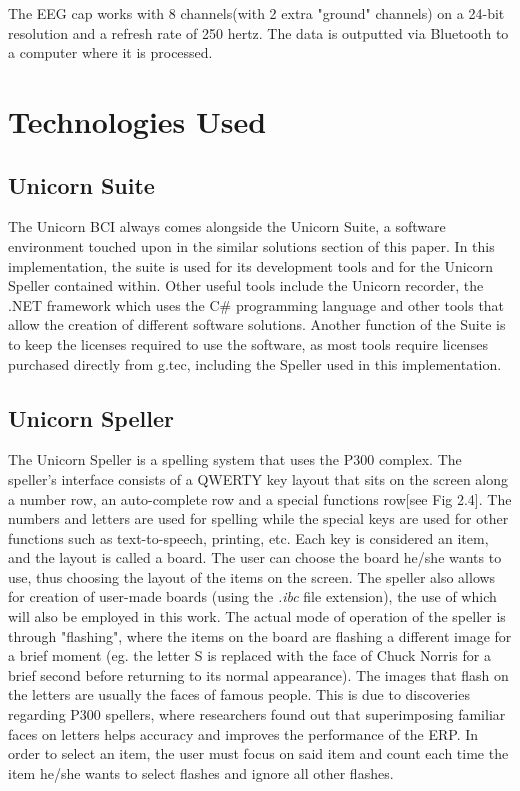 The EEG cap works with 8 channels(with 2 extra "ground" channels) on a 24-bit resolution and a refresh rate of 250 hertz. The data is outputted via Bluetooth to a computer where it is processed.


\section{Technologies Used}
\subsection{Unicorn Suite}
The Unicorn BCI always comes alongside the Unicorn Suite, a software environment touched upon in the similar solutions section of this paper. In this implementation, the suite is used for its development tools and for the Unicorn Speller contained within. Other useful tools include the Unicorn recorder, the .NET framework which uses the C\# programming language and other tools that allow the creation of different software solutions. Another function of the Suite is to keep the licenses required to use the software, as most tools require licenses purchased directly from g.tec\cite{Unicorn_Shop}, including the Speller used in this implementation.


\subsection{Unicorn Speller}
The Unicorn Speller is a spelling system that uses the P300 complex\cite{UnicornSuite_Manual}. The speller's interface consists of a QWERTY key layout that sits on the screen along a number row, an auto-complete row and a special functions row[see Fig 2.4]. The numbers and letters are used for spelling while the special keys are used for other functions such as text-to-speech, printing, etc. Each key is considered an item, and the layout is called a board. The user can choose the board he/she wants to use, thus choosing the layout of the items on the screen. The speller also allows for creation of user-made boards (using the \textit{.ibc} file extension), the use of which will also be employed in this work. 
\vspace{\baselineskip}\newline
The actual mode of operation of the speller is through "flashing"\cite{UnicornSuite_Manual}, where the items on the board are flashing a different image for a brief moment (eg. the letter S is replaced with the face of Chuck Norris for a brief second before returning to its normal appearance). The images that flash on the letters are usually the faces of famous people. This is due to discoveries regarding P300 spellers, where researchers found out that superimposing familiar faces on letters helps accuracy and improves the performance of the ERP\cite{Li_2015}\cite{Kaufmann_2011}. In order to select an item, the user must focus on said item and count each time the item he/she wants to select flashes and ignore all other flashes\cite{UnicornSuite_Manual}.

